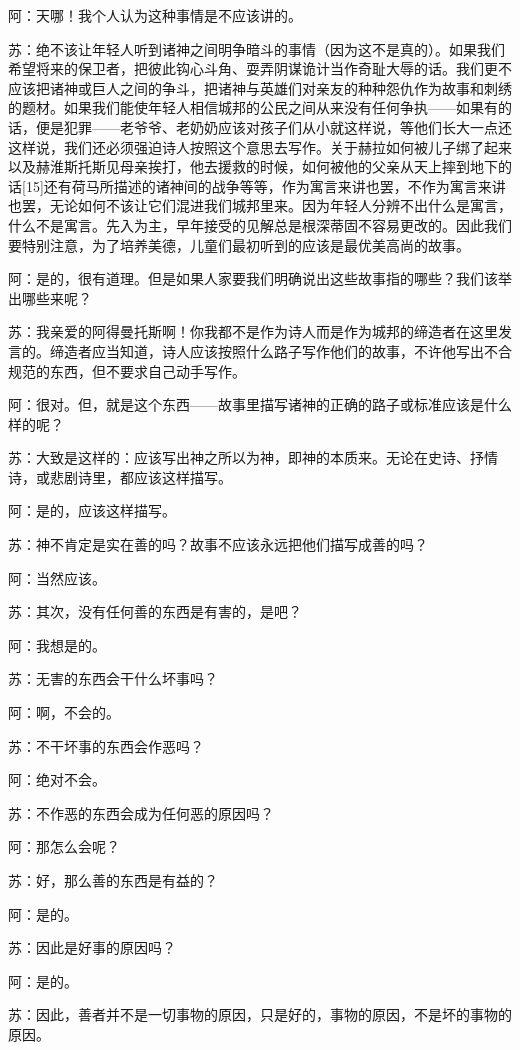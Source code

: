\documentclass[12pt,oneside]{book}
\begin{document}
阿：天哪！我个人认为这种事情是不应该讲的。

苏：绝不该让年轻人听到诸神之间明争暗斗的事情（因为这不是真的）。如果我们希望将来的保卫者，把彼此钩心斗角、耍弄阴谋诡计当作奇耻大辱的话。我们更不应该把诸神或巨人之间的争斗，把诸神与英雄们对亲友的种种怨仇作为故事和刺绣的题材。如果我们能使年轻人相信城邦的公民之间从来没有任何争执——如果有的话，便是犯罪——老爷爷、老奶奶应该对孩子们从小就这样说，等他们长大一点还这样说，我们还必须强迫诗人按照这个意思去写作。关于赫拉如何被儿子绑了起来以及赫淮斯托斯见母亲挨打，他去援救的时候，如何被他的父亲从天上摔到地下的话[15]还有荷马所描述的诸神间的战争等等，作为寓言来讲也罢，不作为寓言来讲也罢，无论如何不该让它们混进我们城邦里来。因为年轻人分辨不出什么是寓言，什么不是寓言。先入为主，早年接受的见解总是根深蒂固不容易更改的。因此我们要特别注意，为了培养美德，儿童们最初听到的应该是最优美高尚的故事。

阿：是的，很有道理。但是如果人家要我们明确说出这些故事指的哪些？我们该举出哪些来呢？

苏：我亲爱的阿得曼托斯啊！你我都不是作为诗人而是作为城邦的缔造者在这里发言的。缔造者应当知道，诗人应该按照什么路子写作他们的故事，不许他写出不合规范的东西，但不要求自己动手写作。

阿：很对。但，就是这个东西——故事里描写诸神的正确的路子或标准应该是什么样的呢？

苏：大致是这样的：应该写出神之所以为神，即神的本质来。无论在史诗、抒情诗，或悲剧诗里，都应该这样描写。

阿：是的，应该这样描写。

苏：神不肯定是实在善的吗？故事不应该永远把他们描写成善的吗？

阿：当然应该。

苏：其次，没有任何善的东西是有害的，是吧？

阿：我想是的。

苏：无害的东西会干什么坏事吗？

阿：啊，不会的。

苏：不干坏事的东西会作恶吗？

阿：绝对不会。

苏：不作恶的东西会成为任何恶的原因吗？

阿：那怎么会呢？

苏：好，那么善的东西是有益的？

阿：是的。

苏：因此是好事的原因吗？

阿：是的。

苏：因此，善者并不是一切事物的原因，只是好的，事物的原因，不是坏的事物的原因。
\end{document}

